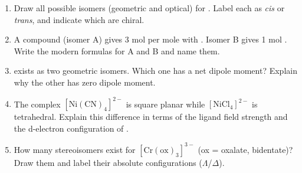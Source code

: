 \documentclass[11pt]{article}
\begin{document}
\begin{exercice}
\begin{enumerate}
\item Draw all possible isomers (geometric and optical) for \ce{[Co(en)2Cl2]+}. Label each as \textit{cis} or \textit{trans}, and indicate which are chiral.
\item A compound  (isomer A) gives 3 mol  per mole with . Isomer B gives 1 mol . Write the modern formulas for A and B and name them.
\item \ce{[Pt(NH3)2Cl2]} exists as two geometric isomers. Which one has a net dipole moment? Explain why the other has zero dipole moment.
\item The complex \ensuremath{\mathrm{[Ni(CN)_{4}]^{2-}}} is square planar while \ensuremath{\mathrm{[NiCl_{4}]^{2-}}} is tetrahedral. Explain this difference in terms of the ligand field strength and the d-electron configuration of .
\item How many stereoisomers exist for \ensuremath{\mathrm{[Cr(ox)_{3}]^{3-}}} (ox = oxalate, bidentate)? Draw them and label their absolute configurations ($\Lambda$/$\Delta$).
\end{enumerate}
\end{exercice}
\end{document}
